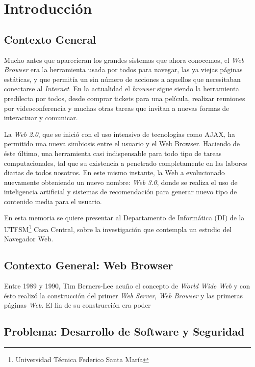 


\chapter{Introducción}
\label{chap1:intro}

\section{Contexto General}
\label{chap1:CG}

Mucho antes que aparecieran los grandes sistemas que ahora conocemos, el \textit{Web Browser} era la herramienta usada por todos para navegar, las ya viejas páginas estáticas, y que permitía un sin número de acciones a aquellos que necesitaban conectarse al \textit{Internet}. En la actualidad el \textit{browser} sigue siendo la herramienta predilecta por todos, desde comprar tickets para una película, realizar reuniones por videoconferencia y muchas otras tareas que invitan a nuevas formas de interactuar y comunicar.


La \textit{Web 2.0}, que se inició con el uso intensivo de tecnologías como AJAX, ha permitido una nueva simbiosis entre el usuario y el Web Browser. Haciendo de éste último, una herramienta casi indispensable para todo tipo de tareas computacionales, tal que su existencia a penetrado completamente en las labores diarias de todos nosotros. En este mismo instante, la Web a evolucionado nuevamente obteniendo un nuevo nombre: \textit{Web 3.0}, donde se realiza el uso de inteligencia artificial y sistemas de recomendación para generar nuevo tipo de contenido media para el usuario.


En esta memoria se quiere presentar al Departamento de Informática (DI) de la UTFSM\footnote{Universidad Técnica Federico Santa María} Casa Central, sobre la investigación que contempla un estudio del Navegador Web.

\section{Contexto General: Web Browser}
\label{chap1:WB}
Entre 1989 y 1990, Tim Berners-Lee acuño el concepto de \textit{World Wide Web} y con ésto realizó la construcción del primer \textit{Web Server}, \textit{Web Browser }y las primeras páginas \textit{Web}. El fin de su construcción era poder


\section{Problema: Desarrollo de Software y Seguridad}
\label{chap1:SD_SS}

